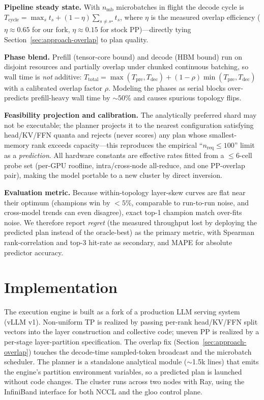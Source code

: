 \documentclass[twocolumn]{article}
\begin{document}
\textbf{Pipeline steady state.} With $n_{\text{mb}}$ microbatches in flight the decode cycle is $T_{\text{cycle}}=\max_s t_s+(1-\eta)\sum_{s\neq s^\star} t_s$, where $\eta$ is the measured overlap efficiency ($\eta\!\approx\!0.65$ for our fork, $\eta\!\approx\!0.15$ for stock PP)---directly tying Section~\ref{sec:approach-overlap} to plan quality.

\textbf{Phase blend.} Prefill (tensor-core bound) and decode (HBM bound) run on disjoint resources and partially overlap under chunked continuous batching, so wall time is \emph{not} additive: $T_{\text{total}}=\max(T_{\text{pre}},T_{\text{dec}})+(1-\rho)\min(T_{\text{pre}},T_{\text{dec}})$ with a calibrated overlap factor $\rho$. Modeling the phases as serial blocks over-predicts prefill-heavy wall time by $\sim\!50\%$ and causes spurious topology flips.

\textbf{Feasibility projection and calibration.} The analytically preferred shard may not be executable; the planner projects it to the nearest configuration satisfying head/KV/FFN quanta and rejects (never scores) any plan whose smallest-memory rank exceeds capacity---this reproduces the empirical ``$n_{\text{req}}\!\le\!100$'' limit as a \emph{prediction}. All hardware constants are effective rates fitted from a $\le 6$-cell probe set (per-GPU roofline, intra/cross-node all-reduce, and one PP-overlap pair), making the model portable to a new cluster by direct inversion.

\textbf{Evaluation metric.} Because within-topology layer-skew curves are flat near their optimum (champions win by $<5\%$, comparable to run-to-run noise, and cross-model trends can even disagree), exact top-1 champion match over-fits noise. We therefore report \emph{regret} (the measured throughput lost by deploying the predicted plan instead of the oracle-best) as the primary metric, with Spearman rank-correlation and top-3 hit-rate as secondary, and MAPE for absolute predictor accuracy.

\section{Implementation}

The execution engine is built as a fork of a production LLM serving system (vLLM v1). Non-uniform TP is realized by passing per-rank head/KV/FFN split vectors into the layer construction and collective code; uneven PP is realized by a per-stage layer-partition specification. The overlap fix (Section~\ref{sec:approach-overlap}) touches the decode-time sampled-token broadcast and the microbatch scheduler. The planner is a standalone analytical module ($\sim$1.5k lines) that emits the engine's partition environment variables, so a predicted plan is launched without code changes. The cluster runs across two nodes with Ray, using the InfiniBand interface for both NCCL and the gloo control plane.
\end{document}
